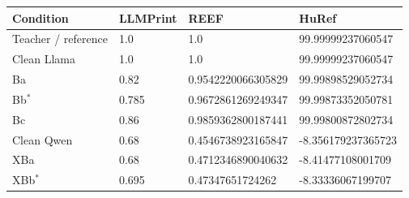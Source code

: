\begin{tabular}{llll}
\toprule
Condition & LLMPrint & REEF & HuRef \\
\midrule
Teacher / reference & 1.0 & 1.0 & 99.99999237060547 \\
Clean Llama & 1.0 & 1.0 & 99.99999237060547 \\
Ba & 0.82 & 0.9542220066305829 & 99.99898529052734 \\
Bb$^\ast$ & 0.785 & 0.9672861269249347 & 99.99873352050781 \\
Bc & 0.86 & 0.9859362800187441 & 99.99800872802734 \\
Clean Qwen & 0.68 & 0.4546738923165847 & -8.356179237365723 \\
XBa & 0.68 & 0.4712346890040632 & -8.41477108001709 \\
XBb$^\ast$ & 0.695 & 0.47347651724262 & -8.33336067199707 \\
\bottomrule
\end{tabular}
